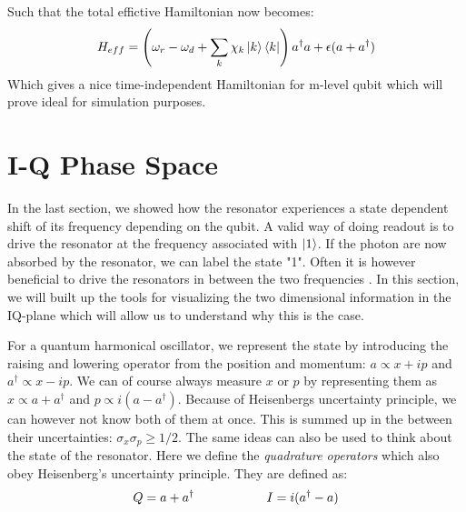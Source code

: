 Such that the total effictive Hamiltonian now becomes:
\begin{equation}
    H_{eff} =  \left(\omega_r - \omega_d + \sum_k \chi_k \ket{k}\bra{k}\right)a^\dagger a + \epsilon(a + a^\dagger)
\end{equation}
Which gives a nice time-independent Hamiltonian for m-level qubit which will prove ideal for simulation purposes. %



\section{I-Q Phase Space}\label{sec:IQ_phase_space}
In the last section, we showed how the resonator experiences a state dependent shift of its frequency depending on the qubit. A valid way of doing readout is to drive the resonator at the frequency associated with $\ket{1}$. If the photon are now absorbed by the resonator, we can label the state "1". Often it is however beneficial to drive the resonators in between the two frequencies \cite{blais2004}. In this section, we will built up the tools for visualizing the two dimensional information in the IQ-plane which will allow us to understand why this is the case.

For a quantum harmonical oscillator, we represent the state by introducing the raising and lowering operator from the position and momentum: $a \propto x + ip$ and $a^\dagger \propto x - ip$. We can of course always measure $x$ or $p$ by representing them as $x \propto a + a^\dagger$ and $p\propto i (a - a^\dagger)$. Because of Heisenbergs uncertainty principle, we can however not know both of them at once. This is summed up in the between their uncertainties: $\sigma_x \sigma_p \geq 1/2$.  The same ideas can also be used to think about the state of the resonator. Here we define the \textit{quadrature operators} which also obey Heisenberg's uncertainty principle. They are defined  as\cite{knight}: 
\begin{equation}
    Q = a + a^\dagger \hspace{2 cm} I = i(a^\dagger - a)
\end{equation}

